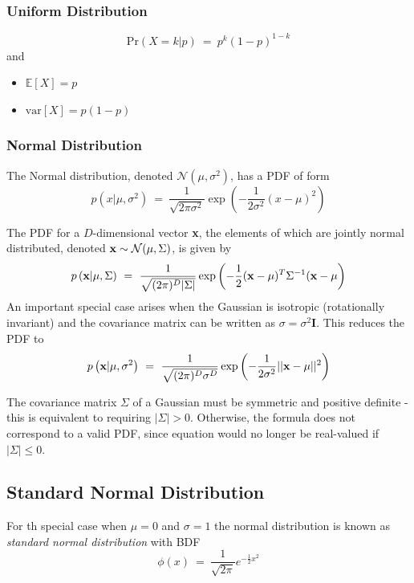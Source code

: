 \documentclass[11pt]{article}
\theoremstyle{plain}
\theoremstyle{definition}
\begin{document}
\subsubsection{Uniform Distribution}

\begin{equation}
\text{Pr}(X=k|p) \ = \ p^k(1-p)^{1-k}
\end{equation}
and
\begin{itemize}
	\item $\mathbb{E}[X] = p$
	\item $\text{var}[X] = p(1-p)$
\end{itemize}

\subsubsection{Normal Distribution}
The Normal distribution, denoted $\mathcal{N}(\mu,\sigma^2)$, has a PDF of form
\begin{equation}
p(x|\mu,\sigma^2) \ = \ \frac{1}{\sqrt{2\pi\sigma^2}} \exp{\left(-\frac{1}{2\sigma^2}(x-\mu)^2\right)}
\end{equation}

The PDF for a $D$-dimensional vector \textbf{x}, the elements of which are jointly normal distributed, denoted $\textbf{x} \sim \mathcal{N}(\boldmath{\mu}, \Sigma)$, is given by
\begin{equation}
p\left(\textbf{x}|\boldmath{\mu},\Sigma\right) \ = \ \frac{1}{\sqrt{(2\pi)^D|\Sigma|}} \exp{\left(-\frac{1}{2}(\textbf{x}-\boldmath{\mu})^T\Sigma^{-1}(\textbf{x}-\boldmath{\mu}\right)}
\end{equation}
An important special case arises when the Gaussian is isotropic (rotationally invariant) and the covariance matrix can be written as $\sigma = \sigma^2\textbf{I}$. This reduces the PDF to
\begin{equation}
p\left( \textbf{x} | \boldmath{\mu} , \sigma^2 \right) \ = \ \frac{1}{\sqrt{(2\pi)^D\sigma^D}} \exp{\left(-\frac{1}{2\sigma^2}||\textbf{x}-\boldmath{\mu}||^2\right)}
\end{equation}

The covariance matrix $\Sigma$ of a Gaussian must be symmetric and positive definite - this is equivalent to requiring $|\Sigma| > 0$. Otherwise, the formula does not correspond to a valid PDF, since equation would no longer be real-valued if $|\Sigma| \leq 0$.


\subsection{Standard Normal Distribution}
For th special case when $\mu = 0$ and $\sigma=1$ the normal distribution is known as \textit{standard normal distribution} with BDF
\begin{equation}
\phi(x) \ = \ \frac{1}{\sqrt{2\pi}} e^{-\frac{1}{2}x^2}
\end{equation}
\end{document}
